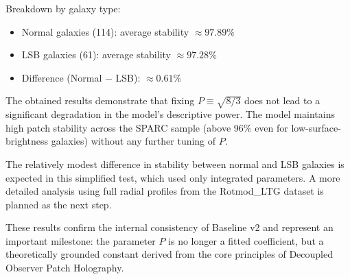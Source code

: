 Breakdown by galaxy type:
\begin{itemize}
    \item Normal galaxies (114): average stability \( \approx 97.89\% \)
    \item LSB galaxies (61): average stability \( \approx 97.28\% \)
    \item Difference (Normal $-$ LSB): \( \approx 0.61\% \)
\end{itemize}

The obtained results demonstrate that fixing \( P \equiv \sqrt{8/3} \) does not lead to a significant degradation in the model's descriptive power. The model maintains high patch stability across the SPARC sample (above 96\% even for low-surface-brightness galaxies) without any further tuning of \( P \).

The relatively modest difference in stability between normal and LSB galaxies is expected in this simplified test, which used only integrated parameters. A more detailed analysis using full radial profiles from the Rotmod\_LTG dataset is planned as the next step.

These results confirm the internal consistency of Baseline v2 and represent an important milestone: the parameter \( P \) is no longer a fitted coefficient, but a theoretically grounded constant derived from the core principles of Decoupled Observer Patch Holography.

